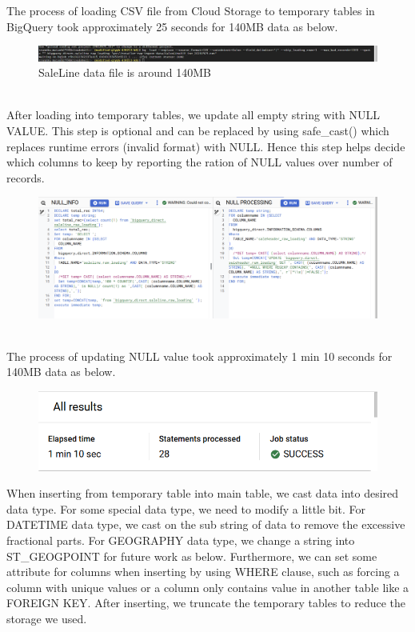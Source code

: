 The process of loading CSV file from Cloud Storage to temporary tables in BigQuery took approximately 25 seconds for 140MB data as below. 
\begin{figure}[htp]
    \centering
    \includegraphics[width=0.75\linewidth]{images/timeproccess.png}
   \caption{SaleLine data file is around 140MB}
\end{figure}
\\After loading into temporary tables, we update all empty string with NULL VALUE. This step is optional and can be replaced by using safe\_cast() which replaces runtime errors (invalid format) with NULL. Hence this step helps decide which columns to keep by reporting the ration of NULL values over number of records. 
\begin{figure}[htp]
    \centering
    \includegraphics[width=0.75\linewidth]{images/NULL_PROC.png}
\end{figure}
\\The process of updating NULL value took approximately 1 min 10 seconds for 140MB data as below. 
\clearpage
\begin{figure}[htp]
    \centering
    \includegraphics[width=0.75\linewidth]{images/NULLtime.png}
\end{figure}
When inserting from temporary table into main table, we cast data into desired data type. For some special data type, we need to modify a little bit. For DATETIME data type, we cast on the sub string of data to remove the excessive fractional parts. For GEOGRAPHY data type, we change a string into ST\_GEOGPOINT for future work as below.  Furthermore, we can set some attribute for columns when inserting by using WHERE clause, such as forcing a column with unique values or a column only contains value in another table like a FOREIGN KEY. After inserting, we truncate the temporary tables to reduce the storage we used.
